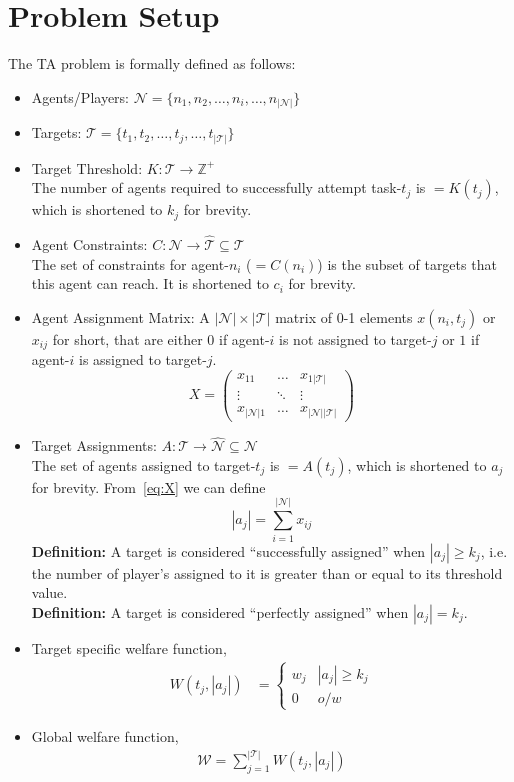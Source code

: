 \documentclass[defaultstyle,12pt]{thesis}
\newcommand{\Pl}{\mathcal{N}} %
\newcommand{\Ta}{\mathcal{T}} %
\newcommand{\We}{\mathcal{W}} %
\begin{document}
\section{Problem Setup}\label{sec:setup}
The TA problem is formally defined as follows:
\begin{itemize}
	\item Agents/Players: $\Pl = \{n_1, n_2, \ldots, n_i, \ldots,n_{|\Pl|}\}$
	\item Targets: $\Ta = \{t_1, t_2, \ldots, t_j, \ldots,t_{|\Ta|}\}$
	\item Target Threshold: $K:\Ta \to \mathbb{Z}^+$\\
	The number of agents required to successfully attempt task-$t_j$ is $= K(t_j)$, which is shortened to $k_j$ for brevity.
	
	\item Agent Constraints: $C:\Pl \to \hat{\Ta} \subseteq \Ta$\\
	The set of constraints for agent-$n_i$ ($= C(n_i)$) is the subset of targets that this agent can reach. It is shortened to $c_i$ for brevity.
	\item Agent Assignment Matrix: A $|\Pl| \times |\Ta|$ matrix of 0-1 elements $x(n_i, t_j)$ or $x_{ij}$ for short, that are either $0$ if agent-$i$ is not assigned to target-$j$ or $1$ if agent-$i$ is assigned to target-$j$.
	\begin{equation}\label{eq:X}
		X = \left(\begin{array}{ccc}
			x_{11} & \ldots & x_{1|\Ta|}\\
			\vdots & \ddots & \vdots\\
			x_{|\Pl|1} & \ldots & x_{|\Pl||\Ta|}
		\end{array}\right)
	\end{equation}
	\item Target Assignments: $A:\Ta \to \hat{\Pl} \subseteq \Pl$\\
	The set of agents assigned to target-$t_j$ is $= A(t_j)$, which is shortened to $a_j$ for brevity. From~\eqref{eq:X} we can define
\begin{equation}\label{eq:aj}
	|a_j| = \sum\limits_{i = 1}^{|\Pl|} x_{ij}
\end{equation}
	\textbf{Definition:} A target is considered ``successfully assigned'' when $|a_j| \geq k_j$, i.e. the number of player's assigned to it is greater than or equal to its threshold value.\\
	\textbf{Definition:} A target is considered ``perfectly assigned'' when $|a_j| = k_j$.
	\item Target specific welfare function,
\begin{align}\label{eq:wf}
	W(t_j, |a_j|) & = \left\{
	\begin{array}{ll}
		w_j & |a_j| \geq k_j\\
		0 & o/w
	\end{array}\right.
\end{align}
	\item Global welfare function,
\begin{align}\label{eq:gwf}
	\We = \sum\limits_{j = 1}^{|\Ta|} W(t_j, |a_j|)
\end{align}
\end{itemize}
\end{document}
